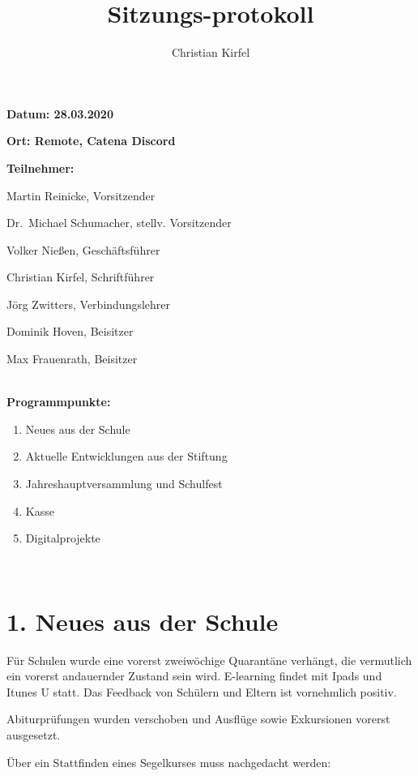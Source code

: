 \documentclass[a4paper, 11pt]{article}
\title{Sitzungs-protokoll}
\author{Christian Kirfel}
\begin{document}
\pagestyle{style1}

\textbf{Datum: 28.03.2020} %

\textbf{Ort: Remote, Catena Discord} %

\textbf{Teilnehmer:} %
\begin{description}
\item Martin Reinicke, Vorsitzender
\item Dr.~Michael Schumacher, stellv. Vorsitzender
\item Volker Nießen, Geschäftsführer
\item Christian Kirfel, Schriftführer
\item Jörg Zwitters, Verbindungslehrer
\item Dominik Hoven, Beisitzer
\item Max Frauenrath, Beisitzer
\end{description}

\makebox[\linewidth]{\rule{\linewidth}{0.4pt}}\\
\textbf{Programmpunkte:} 
\begin{enumerate}
\item Neues aus der Schule
\item Aktuelle Entwicklungen aus der Stiftung
\item Jahreshauptversammlung und Schulfest
\item Kasse
\item Digitalprojekte
\end{enumerate}
\makebox[\linewidth]{\rule{\linewidth}{0.4pt}}\\

\newpage

\section*{1. Neues aus der Schule}


Für Schulen wurde eine vorerst zweiwöchige Quarantäne verhängt, die vermutlich ein vorerst andauernder Zustand sein wird.
E-learning findet mit Ipads und Itunes U statt. Das Feedback von Schülern und Eltern ist vornehmlich positiv.

Abiturprüfungen wurden verschoben und Ausflüge sowie Exkursionen vorerst ausgesetzt.

Über ein Stattfinden eines Segelkurses muss nachgedacht werden:
\end{document}

